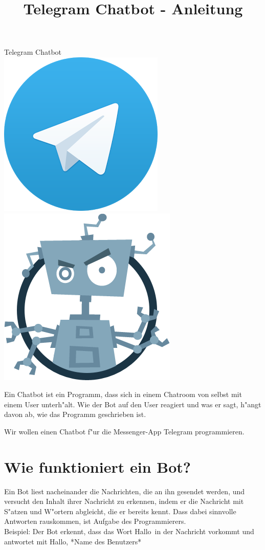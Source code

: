 \documentclass[a4paper]{article}
\title{Telegram Chatbot - Anleitung}
\begin{document}
	\begin{center}
		\huge Telegram Chatbot \\
		\includegraphics[scale=0.1]{telegram.png}
		\includegraphics[scale=0.1]{bot.png}
	\end{center}

Ein Chatbot ist ein Programm, dass sich in einem Chatroom von selbst mit einem User unterh"alt. Wie der Bot auf den User reagiert und was er sagt, h"angt davon ab, wie das Programm geschrieben ist.
	
Wir wollen einen Chatbot f"ur die Messenger-App Telegram programmieren.
	
	\section{Wie funktioniert ein Bot?}
Ein Bot liest nacheinander die Nachrichten, die an ihn gesendet werden, und versucht den Inhalt ihrer Nachricht zu erkennen, indem er die Nachricht mit S"atzen und W"ortern abgleicht, die er bereits kennt. Dass dabei sinnvolle Antworten rauskommen, ist Aufgabe des Programmierers. \\
Beispiel: Der Bot erkennt, dass das Wort \grqq Hallo\grqq\ in der Nachricht vorkommt und antwortet mit \grqq Hallo, *Name des Benutzers*\grqq
		
\end{document}
